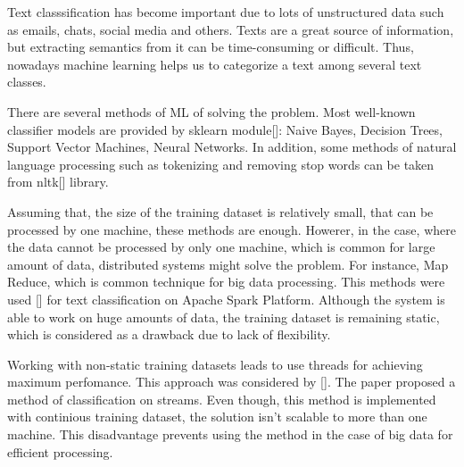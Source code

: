 \label {fs-short-intro}



    Text classsification has become important due to lots of unstructured data such as emails, chats, social media and others. Texts are a great source of information, but extracting semantics from it can be time-consuming or difficult. Thus, nowadays machine learning helps us to categorize a text among several text classes. 
    
    There are several methods of ML of solving the problem. Most well-known classifier models are provided by sklearn module[]: Naive Bayes, Decision Trees, Support Vector Machines, Neural Networks. In addition, some methods of natural language processing such as tokenizing and removing stop words can be taken from nltk[] library. 
    
    Assuming that, the size of the training dataset is relatively small, that can be processed by one machine, these methods are enough. Howerer, in the case, where the data cannot be processed by only one machine, which is common for large amount of data, distributed systems might solve the problem. For instance, Map Reduce, which is common technique for big data processing. This methods were used [] for text classification on Apache Spark Platform. Although the system is able to work on huge amounts of data, the training dataset is remaining static, which is considered as a drawback due to lack of flexibility.
    
    Working with non-static training datasets leads to use threads for achieving maximum perfomance. This approach was considered by []. The paper proposed a method of classification on streams. Even though, this method is implemented with continious training dataset, the solution isn't scalable to more than one machine. This disadvantage prevents using the method in the case of big data for efficient processing.
    
